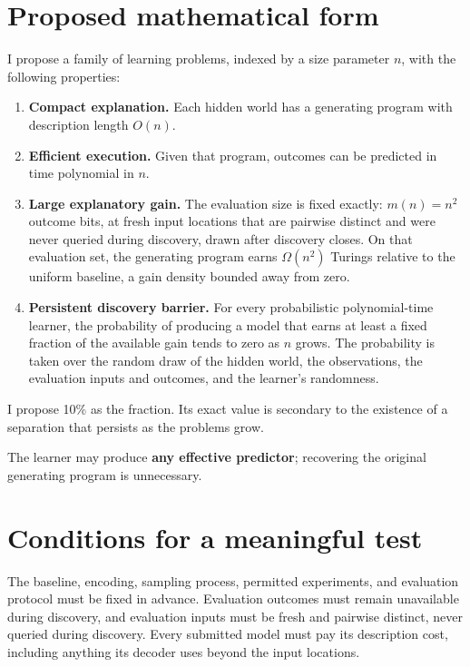 \documentclass[11pt]{article}
\begin{document}
\section*{Proposed mathematical form}

I propose a family of learning problems, indexed by a size parameter $n$, with the following properties:

\begin{enumerate}
\item \textbf{Compact explanation.} Each hidden world has a generating program with description length $O(n)$.
\item \textbf{Efficient execution.} Given that program, outcomes can be predicted in time polynomial in $n$.
\item \textbf{Large explanatory gain.} The evaluation size is fixed exactly: $m(n) = n^2$ outcome bits, at fresh input locations that are pairwise distinct and were never queried during discovery, drawn after discovery closes. On that evaluation set, the generating program earns $\Omega(n^2)$ Turings relative to the uniform baseline, a gain density bounded away from zero.
\item \textbf{Persistent discovery barrier.} For every probabilistic polynomial-time learner, the probability of producing a model that earns at least a fixed fraction of the available gain tends to zero as $n$ grows. The probability is taken over the random draw of the hidden world, the observations, the evaluation inputs and outcomes, and the learner's randomness.
\end{enumerate}

I propose 10\% as the fraction. Its exact value is secondary to the existence of a separation that persists as the problems grow.

The learner may produce \textbf{any effective predictor}; recovering the original generating program is unnecessary.

\section*{Conditions for a meaningful test}

The baseline, encoding, sampling process, permitted experiments, and evaluation protocol must be fixed in advance. Evaluation outcomes must remain unavailable during discovery, and evaluation inputs must be fresh and pairwise distinct, never queried during discovery. Every submitted model must pay its description cost, including anything its decoder uses beyond the input locations.
\end{document}
